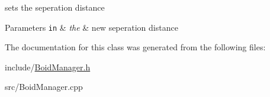 sets the seperation distance 


\begin{DoxyParams}[1]{Parameters}
\mbox{\tt in}  & {\em the} & new seperation distance \\
\hline
\end{DoxyParams}


The documentation for this class was generated from the following files:\begin{DoxyCompactItemize}
\item 
include/\hyperlink{BoidManager_8h}{BoidManager.h}\item 
src/BoidManager.cpp\end{DoxyCompactItemize}

